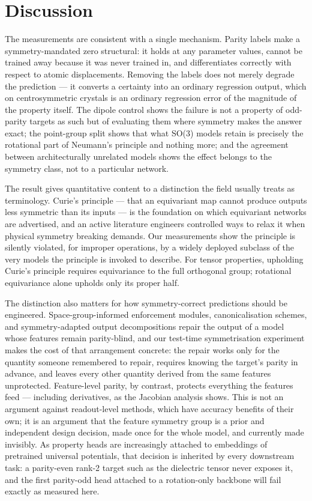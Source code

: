\section*{Discussion}

The measurements are consistent with a single mechanism. Parity labels make a symmetry-mandated zero structural: it holds at any parameter values, cannot be trained away because it was never trained in, and differentiates correctly with respect to atomic displacements. Removing the labels does not merely degrade the prediction --- it converts a certainty into an ordinary regression output, which on centrosymmetric crystals is an ordinary regression error of the magnitude of the property itself. The dipole control shows the failure is not a property of odd-parity targets as such but of evaluating them where symmetry makes the answer exact; the point-group split shows that what SO(3) models retain is precisely the rotational part of Neumann's principle and nothing more; and the agreement between architecturally unrelated models shows the effect belongs to the symmetry class, not to a particular network.

The result gives quantitative content to a distinction the field usually treats as terminology. Curie's principle --- that an equivariant map cannot produce outputs less symmetric than its inputs --- is the foundation on which equivariant networks are advertised, and an active literature engineers controlled ways to relax it when physical symmetry breaking demands. Our measurements show the principle is silently violated, for improper operations, by a widely deployed subclass of the very models the principle is invoked to describe. For tensor properties, upholding Curie's principle requires equivariance to the full orthogonal group; rotational equivariance alone upholds only its proper half.

The distinction also matters for how symmetry-correct predictions should be engineered. Space-group-informed enforcement modules, canonicalisation schemes, and symmetry-adapted output decompositions repair the output of a model whose features remain parity-blind, and our test-time symmetrisation experiment makes the cost of that arrangement concrete: the repair works only for the quantity someone remembered to repair, requires knowing the target's parity in advance, and leaves every other quantity derived from the same features unprotected. Feature-level parity, by contrast, protects everything the features feed --- including derivatives, as the Jacobian analysis shows. This is not an argument against readout-level methods, which have accuracy benefits of their own; it is an argument that the feature symmetry group is a prior and independent design decision, made once for the whole model, and currently made invisibly. As property heads are increasingly attached to embeddings of pretrained universal potentials, that decision is inherited by every downstream task: a parity-even rank-2 target such as the dielectric tensor never exposes it, and the first parity-odd head attached to a rotation-only backbone will fail exactly as measured here.

